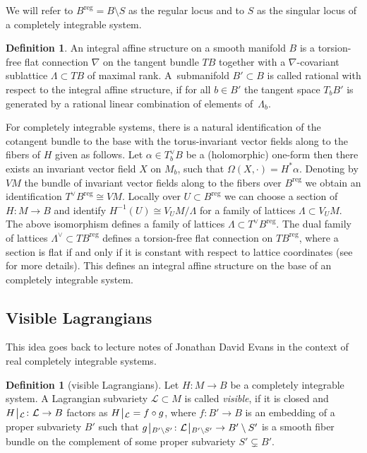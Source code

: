 \documentclass[pdftex]{sigma}
\numberwithin{equation}{section}
\theoremstyle{definition}
\newtheorem{defi}[theo]{Definition}
\newcommand{\reg}{\mathrm{reg}}
\newcommand{\rest}{\: \rule[-3.5pt]{0.5pt}{11.5pt}\,{}}
\renewcommand{\to}{\rightarrow}
\newcommand{\calL}{\mathcal{L}}
\begin{document}
We will refer to $B^\reg=B\setminus S$ as the regular locus and to $S$ as the singular locus of a completely integrable system.
\begin{defi} An integral affine structure on a smooth manifold $B$ is a torsion-free flat connection $\nabla$ on the tangent bundle $TB$ together with a $\nabla$-covariant sublattice $\Lambda \subset TB$ of maximal rank. A~submanifold $B' \subset B$ is called rational with respect to the integral affine structure, if for all $b \in B'$ the tangent space $T_bB'$ is generated by a rational linear combination of elements of~$\Lambda_b$.
\end{defi}
For completely integrable systems, there is a natural identification of the cotangent bundle to the base with the torus-invariant vector fields along to the fibers of $H$ given as follows. Let $\alpha \in T_b^\vee B$ be a (holomorphic) one-form then there exists an invariant vector field $X$ on $M_b$, such that $\Omega(X,\cdot)=H^*\alpha$. Denoting by $VM$ the bundle of invariant vector fields along to the fibers over $B^\reg$ we obtain an identification $T^\vee B^\reg \cong VM$. Locally over $U \subset B^\reg$ we can choose a section of $H\colon M \to B$ and identify $H^{-1}(U)\cong V_UM/\Lambda$ for a family of lattices $\Lambda \subset V_UM$. The above isomorphism defines a family of lattices $\Lambda \subset T^\vee B^\reg$. The dual family of lattices $\Lambda^\vee\subset TB^\reg$ defines a torsion-free flat connection on $T B^\reg$, where a section is flat if and only if it is constant with respect to lattice coordinates (see \cite[Section~3]{Freed} for more details). This defines an integral affine structure on the base of an completely integrable system.

\subsection{Visible Lagrangians}\label{sec:visible}
This idea goes back to lecture notes of Jonathan David Evans \cite[Chapter~5]{visible} in the context of real completely integrable systems.

\begin{defi}[visible Lagrangians]\label{def:visible-lagrangians}
Let $H\colon M \to B$ be a completely integrable system. A Lagrangian subvariety $\calL \subset M$ is called \textit{visible}, if it is closed and $H\rest_{\calL}\colon \calL \to B$ factors as $H\rest_{\calL}=f \circ g$, where $f\colon B' \to B$ is an embedding of a proper subvariety $B'$ such that $g\rest_{B'\setminus S'}\colon \calL\rest_{B'\setminus S'} \to B'\setminus S'$ is a smooth fiber bundle on the complement of some proper subvariety $S' \subsetneq B'$.
\end{defi}
\end{document}
